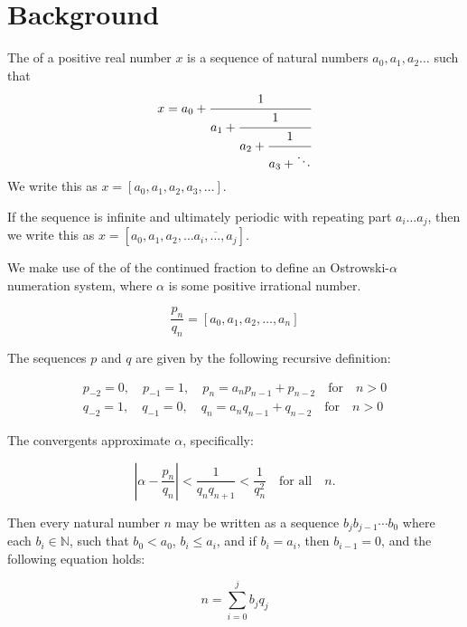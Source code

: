 \section{Background}\label{sec:background}

The  of a positive real number $x$ is a sequence of natural numbers $a_0,a_1,a_2\ldots$ such that \[
x=a_0+\cfrac{1}{a_1+\cfrac{1}{a_2+\cfrac{1}{a_3+\ddots}}}
\]
We write this as $x = [a_0,a_1,a_2,a_3,\ldots]$.

If the sequence is infinite and ultimately periodic with repeating part $a_i\dots a_j$, then we write this as $x = [a_0,a_1,a_2,\dots \overline{a_i,\dots,a_j}]$.

We make use of the  of the continued fraction to define an Ostrowski-$\alpha$ numeration system, where $\alpha$ is some positive irrational number.

\begin{equation*}
    \frac{p_n}{q_n} = [a_0, a_1, a_2, \ldots, a_n]
\end{equation*}

The sequences $p$ and $q$ are given by the following recursive definition:

\begin{equation}\label{eqn:conv-def}
\begin{split}
    p_{-2} = 0, \quad p_{-1} = 1, \quad p_n = a_n p_{n-1} + p_{n-2} \quad \text{for} \quad n > 0\\
    q_{-2} = 1, \quad q_{-1} = 0, \quad q_n = a_n q_{n-1} + q_{n-2} \quad \text{for} \quad n > 0
\end{split}
\end{equation}

The convergents approximate $\alpha$, specifically:

\begin{equation*}
    \left| \alpha - \frac{p_n}{q_n} \right| < \frac{1}{q_n q_{n+1}} < \frac{1}{q_n^2} \quad \text{for all} \quad n.
\end{equation*}

Then every natural number $n$ may be written as a sequence $b_j b_{j-1} \cdots b_0$ where each $b_i \in \mathbb{N}$, such that $b_0 < a_0$, $b_i \leq a_i$, and if $b_i = a_i$, then $b_{i-1} = 0$, and the following equation holds:

\begin{equation*}\label{eqn:ostrowski-def}
    n = \sum_{i=0}^j b_j q_j
\end{equation*}


